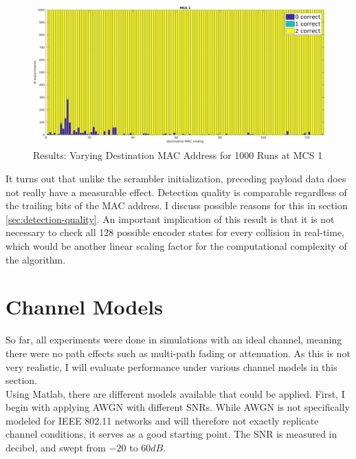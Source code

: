 \begin{figure}[H]
	\centering
	\includegraphics[height=5.5cm]{gfx/plots/destination}
	\caption[Results: Varying Destination \gls{MAC} Address for 1000 Runs]{Results: Varying Destination \gls{MAC} Address for 1000 Runs at MCS 1}
	\label{fig:vary_dest}
\end{figure}

It turns out that unlike the scrambler initialization, preceding payload data does not really have a measurable effect. Detection quality is comparable regardless of the trailing bits of the \gls{MAC} address. I discuss possible reasons for this in section \ref{sec:detection-quality}. An important implication of this result is that it is not necessary to check all 128 possible encoder states for every collision in real-time, which would be another linear scaling factor for the computational complexity of the algorithm.



\section{Channel Models}

So far, all experiments were done in simulations with an ideal channel, meaning there were no path effects such as multi-path fading or attenuation. As this is not very realistic, I will evaluate performance under various channel models in this section.\\

Using Matlab, there are different models available that could be applied. First, I begin with applying \gls{AWGN} with different \glspl{SNR}. While \gls{AWGN} is not specifically modeled for IEEE 802.11 networks and will therefore not exactly replicate channel conditions, it serves as a good starting point. The \gls{SNR} is measured in decibel, and swept from $ -20 $ to $ 60 dB $.

